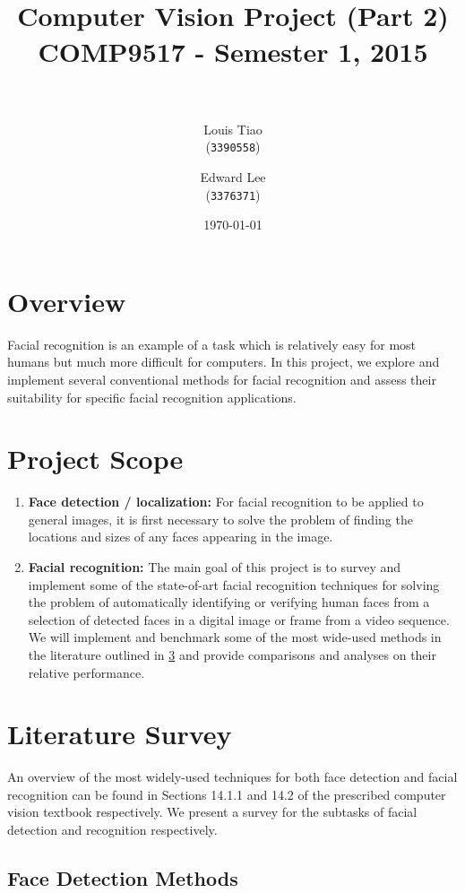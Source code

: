 \documentclass[11pt]{article} %
\title{ 
\normalfont \normalsize 
\horrule{0.5pt} \\[0.4cm] %
\Large Computer Vision Project (Part 2) \\ [0.1cm] %
\large COMP9517 - Semester 1, 2015 \\ [0.2cm]
\horrule{2pt} \\[0.5cm] %
}
\author{
  Louis Tiao \\
  (\texttt{3390558})
  \and
  Edward Lee\\
  (\texttt{3376371})
} %
\date{\normalsize\today} %
\theoremstyle{plain}
\theoremstyle{definition}
\theoremstyle{remark}
\numberwithin{equation}{section} %
\numberwithin{figure}{section} %
\numberwithin{table}{section} %
\begin{document}
\maketitle %

\section{Overview}

Facial recognition is an example of a task which is relatively easy for most humans but much more difficult for computers. In this project, we explore and implement several conventional methods for facial recognition and assess their suitability for specific facial recognition applications.

\section{Project Scope}

\begin{enumerate}
  \item \textbf{Face detection / localization:} For facial recognition to be applied to general images, it is first necessary to solve the problem of finding the locations and sizes of any faces appearing in the image.
  \item \textbf{Facial recognition:} The main goal of this project is to survey and implement some of the state-of-art facial recognition techniques for solving the problem of automatically identifying or verifying human faces from a selection of detected faces in a digital image or frame from a video sequence. We will implement and benchmark some of the most wide-used methods in the literature outlined in \cref{sec:lit_survey} and provide comparisons and analyses on their relative performance.
\end{enumerate}

\section{Literature Survey} \label{sec:lit_survey}

An overview of the most widely-used techniques for both face detection and facial recognition can be found in Sections 14.1.1 and 14.2 of the prescribed computer vision textbook \citep[p.~658,~668]{szeliski2010computer} respectively. We present a survey for the subtasks of facial detection and recognition respectively.

\subsection{Face Detection Methods} 
\end{document}
